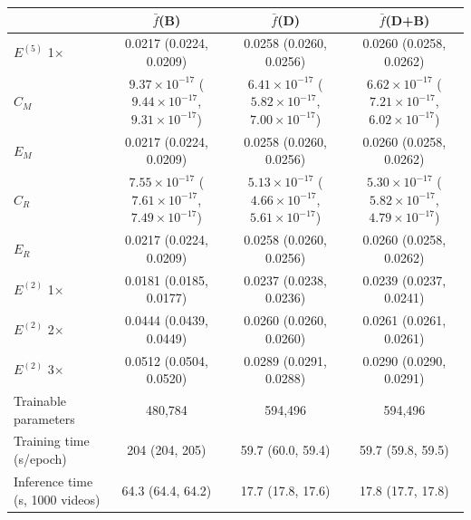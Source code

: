 \begin{tabular}{lccc}
\toprule
 & $\bar f$(B) & $\bar f$(D) & $\bar f$(D+B) \\
\midrule
$E^{(5)}$ 1$\times$ & 0.0217 (0.0224, 0.0209) & 0.0258 (0.0260, 0.0256) & 0.0260 (0.0258, 0.0262) \\
$C_M$ & $9.37\times10^{-17}$ ($9.44\times10^{-17}$, $9.31\times10^{-17}$) & $6.41\times10^{-17}$ ($5.82\times10^{-17}$, $7.00\times10^{-17}$) & $6.62\times10^{-17}$ ($7.21\times10^{-17}$, $6.02\times10^{-17}$) \\
$E_M$ & 0.0217 (0.0224, 0.0209) & 0.0258 (0.0260, 0.0256) & 0.0260 (0.0258, 0.0262) \\
$C_R$ & $7.55\times10^{-17}$ ($7.61\times10^{-17}$, $7.49\times10^{-17}$) & $5.13\times10^{-17}$ ($4.66\times10^{-17}$, $5.61\times10^{-17}$) & $5.30\times10^{-17}$ ($5.82\times10^{-17}$, $4.79\times10^{-17}$) \\
$E_R$ & 0.0217 (0.0224, 0.0209) & 0.0258 (0.0260, 0.0256) & 0.0260 (0.0258, 0.0262) \\
$E^{(2)}$ 1$\times$ & 0.0181 (0.0185, 0.0177) & 0.0237 (0.0238, 0.0236) & 0.0239 (0.0237, 0.0241) \\
$E^{(2)}$ 2$\times$ & 0.0444 (0.0439, 0.0449) & 0.0260 (0.0260, 0.0260) & 0.0261 (0.0261, 0.0261) \\
$E^{(2)}$ 3$\times$ & 0.0512 (0.0504, 0.0520) & 0.0289 (0.0291, 0.0288) & 0.0290 (0.0290, 0.0291) \\
Trainable parameters & 480,784 & 594,496 & 594,496 \\
Training time (s/epoch) & 204 (204, 205) & 59.7 (60.0, 59.4) & 59.7 (59.8, 59.5) \\
Inference time (s, 1000 videos) & 64.3 (64.4, 64.2) & 17.7 (17.8, 17.6) & 17.8 (17.7, 17.8) \\
\bottomrule
\end{tabular}
